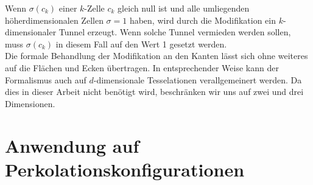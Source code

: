Wenn $\sigma(c_k)$ einer $k$-Zelle $c_k$ gleich null ist und alle umliegenden h\"oherdimensionalen Zellen $\sigma=1$ haben, wird durch die Modifikation ein $k$-dimensionaler Tunnel erzeugt. Wenn solche Tunnel vermieden werden sollen, muss $\sigma(c_k)$ in diesem Fall auf den Wert 1 gesetzt werden. 
\\

Die formale Behandlung der Modifikation an den Kanten l\"asst sich ohne weiteres auf die Fl\"achen und Ecken \"ubertragen. In entsprechender Weise kann der Formalismus auch auf $d$-dimensionale Tesselationen verallgemeinert werden. Da dies in dieser Arbeit nicht ben\"otigt wird, beschr\"anken wir uns auf zwei und drei Dimensionen.  

\section{Anwendung auf Perkolationskonfigurationen}

